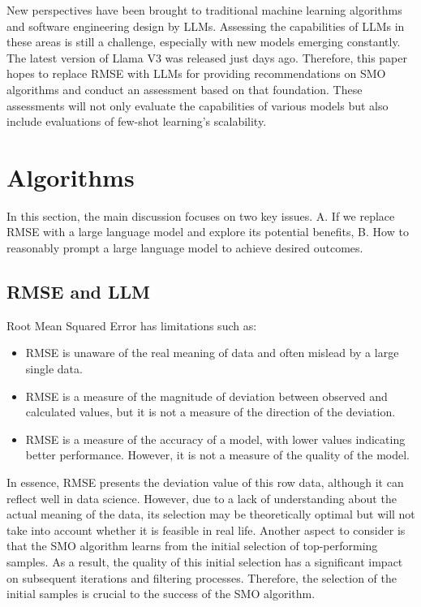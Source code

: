 \documentclass{ieeeaccess}
\begin{document}
New perspectives have been brought to traditional machine learning algorithms and software engineering design by LLMs. Assessing the capabilities of LLMs in these areas is still a challenge, especially with new models emerging constantly. The latest version of Llama V3 was released just days ago. Therefore, this paper hopes to replace RMSE with LLMs for providing recommendations on SMO algorithms and conduct an assessment based on that foundation. These assessments will not only evaluate the capabilities of various models but also include evaluations of few-shot learning's scalability.


\section{Algorithms}
\label{sec:algorithms}

In this section, the main discussion focuses on two key issues.
A. If we replace RMSE with a large language model and explore its potential benefits,
B. How to reasonably prompt a large language model to achieve desired outcomes.

\subsection{RMSE and LLM}
Root Mean Squared Error has limitations such as: 
\begin{itemize}
    \item RMSE is unaware of the real meaning of data and often mislead by a large single data.
    \item RMSE is a measure of the magnitude of deviation between observed and calculated values, but it is not a measure of the direction of the deviation.
    \item RMSE is a measure of the accuracy of a model, with lower values indicating better performance. However, it is not a measure of the quality of the model.
\end{itemize}
In essence, RMSE presents the deviation value of this row data, although it can reflect well in data science. However, due to a lack of understanding about the actual meaning of the data, its selection may be theoretically optimal but will not take into account whether it is feasible in real life. Another aspect to consider is that the SMO algorithm learns from the initial selection of top-performing samples. As a result, the quality of this initial selection has a significant impact on subsequent iterations and filtering processes. Therefore, the selection of the initial samples is crucial to the success of the SMO algorithm.
\end{document}
